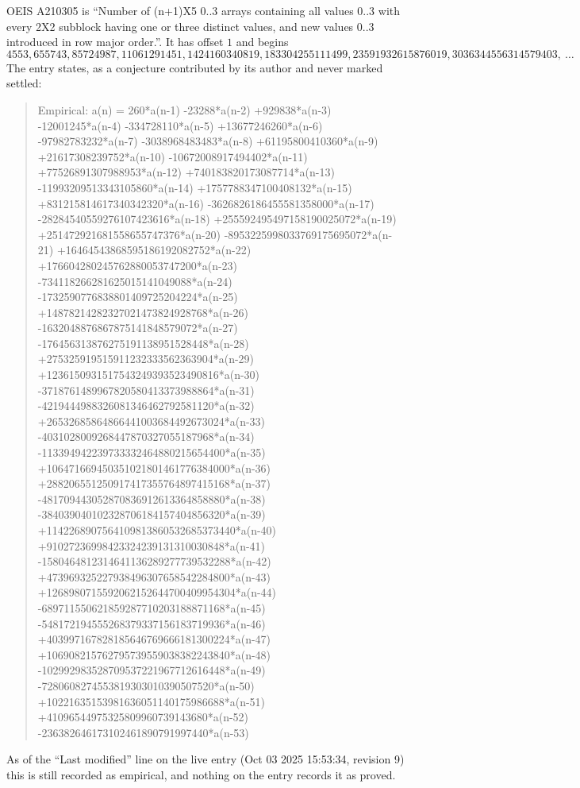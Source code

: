 \documentclass[11pt,a4paper]{article}
\theoremstyle{plain}
\theoremstyle{definition}
\begin{document}
OEIS A210305 is ``Number of (n+1)X5 0..3 arrays containing all values 0..3 with every 2X2 subblock having one or three distinct values, and new values 0..3 introduced in row major order.''. It has offset $1$ and begins
\[
4553, 655743, 85724987, 11061291451, 1424160340819, 183304255111499, 23591932615876019, 3036344556314579403,\ \dots
\]
The entry states, as a conjecture contributed by its author and never marked settled:
\begin{quote}
Empirical: a(n) = 260*a(n-1) -23288*a(n-2) +929838*a(n-3) -12001245*a(n-4) -334728110*a(n-5) +13677246260*a(n-6) -97982783232*a(n-7) -3038968483483*a(n-8) +61195800410360*a(n-9) +21617308239752*a(n-10) -10672008917494402*a(n-11) +77526891307988953*a(n-12) +740183820173087714*a(n-13) -11993209513343105860*a(n-14) +1757788347100408132*a(n-15) +831215814617340342320*a(n-16) -3626826186455581358000*a(n-17) -28284540559276107423616*a(n-18) +255592495497158190025072*a(n-19) +251472921681558655747376*a(n-20) -8953225998033769175695072*a(n-21) +16464543868595186192082752*a(n-22) +176604280245762880053747200*a(n-23) -734118266281625015141049088*a(n-24) -1732590776838801409725204224*a(n-25) +14878214282327021473824928768*a(n-26) -1632048876867875141848579072*a(n-27) -176456313876275191138951528448*a(n-28) +275325919515911232333562363904*a(n-29) +1236150931517543249393523490816*a(n-30) -3718761489967820580413373988864*a(n-31) -4219444988326081346462792581120*a(n-32) +26532685864866441003684492673024*a(n-33) -4031028009268447870327055187968*a(n-34) -113394942239733332464880215654400*a(n-35) +106471669450351021801461776384000*a(n-36) +288206551250917417355764897415168*a(n-37) -481709443052870836912613364858880*a(n-38) -384039040102328706184157404856320*a(n-39) +1142268907564109813860532685373440*a(n-40) +91027236998423324239131310030848*a(n-41) -1580464812314641136289277739532288*a(n-42) +473969325227938496307658542284800*a(n-43) +1268980715592062152644700409954304*a(n-44) -689711550621859287710203188871168*a(n-45) -548172194555268379337156183719936*a(n-46) +403997167828185646769666181300224*a(n-47) +106908215762795739559038382243840*a(n-48) -102992983528709537221967712616448*a(n-49) -7280608274553819303010390507520*a(n-50) +10221635153981636051140175986688*a(n-51) +41096544975325809960739143680*a(n-52) -236382646173102461890791997440*a(n-53)
\end{quote}
As of the ``Last modified'' line on the live entry (Oct 03 2025 15:53:34, revision 9) this is still
recorded as empirical, and nothing on the entry records it as proved.
\end{document}
